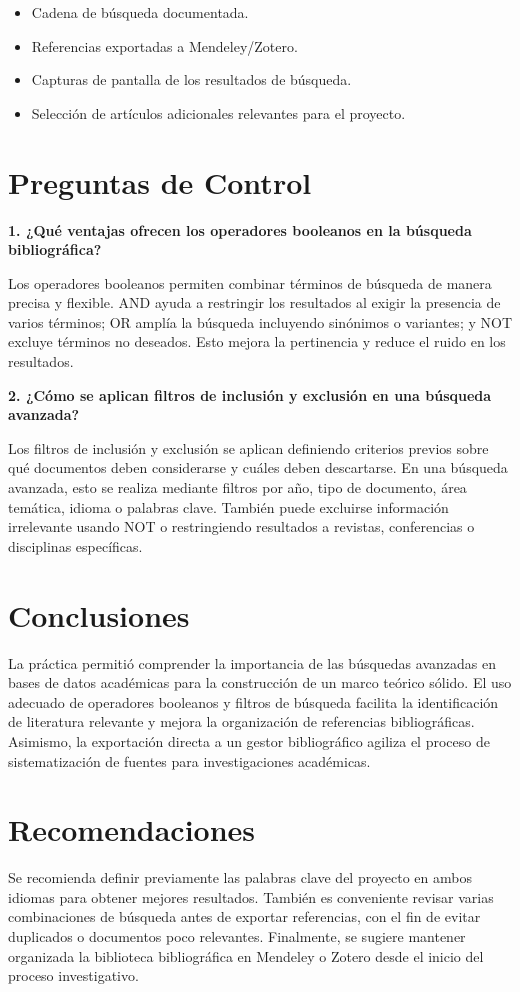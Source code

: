 \documentclass[11pt,a4paper]{article}
\begin{document}
\begin{itemize}[leftmargin=1.2cm]
    \item Cadena de búsqueda documentada.
    \item Referencias exportadas a Mendeley/Zotero.
    \item Capturas de pantalla de los resultados de búsqueda.
    \item Selección de artículos adicionales relevantes para el proyecto.
\end{itemize}

\section{Preguntas de Control}
\textbf{1. ¿Qué ventajas ofrecen los operadores booleanos en la búsqueda bibliográfica?}

Los operadores booleanos permiten combinar términos de búsqueda de manera precisa y flexible. AND ayuda a restringir los resultados al exigir la presencia de varios términos; OR amplía la búsqueda incluyendo sinónimos o variantes; y NOT excluye términos no deseados. Esto mejora la pertinencia y reduce el ruido en los resultados.

\textbf{2. ¿Cómo se aplican filtros de inclusión y exclusión en una búsqueda avanzada?}

Los filtros de inclusión y exclusión se aplican definiendo criterios previos sobre qué documentos deben considerarse y cuáles deben descartarse. En una búsqueda avanzada, esto se realiza mediante filtros por año, tipo de documento, área temática, idioma o palabras clave. También puede excluirse información irrelevante usando NOT o restringiendo resultados a revistas, conferencias o disciplinas específicas.

\section{Conclusiones}
La práctica permitió comprender la importancia de las búsquedas avanzadas en bases de datos académicas para la construcción de un marco teórico sólido. El uso adecuado de operadores booleanos y filtros de búsqueda facilita la identificación de literatura relevante y mejora la organización de referencias bibliográficas. Asimismo, la exportación directa a un gestor bibliográfico agiliza el proceso de sistematización de fuentes para investigaciones académicas.

\section{Recomendaciones}
Se recomienda definir previamente las palabras clave del proyecto en ambos idiomas para obtener mejores resultados. También es conveniente revisar varias combinaciones de búsqueda antes de exportar referencias, con el fin de evitar duplicados o documentos poco relevantes. Finalmente, se sugiere mantener organizada la biblioteca bibliográfica en Mendeley o Zotero desde el inicio del proceso investigativo.
\end{document}
